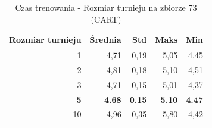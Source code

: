 \begin{table}[htbp]
\centering
\small
\setlength{\tabcolsep}{6pt}
\renewcommand{\arraystretch}{1.2}
\caption{Czas trenowania - Rozmiar turnieju na zbiorze 73 (CART)}
\label{tab:CART_tournament_size_73_time}
\begin{tabular}{r|r|r|r|r}
\toprule
Rozmiar turnieju & Średnia & Std & Maks & Min \\
\hline
1 & 4,71 & 0,19 & 5,05 & 4,45 \\
2 & 4,81 & 0,18 & 5,10 & 4,51 \\
3 & 4,71 & 0,15 & 5,01 & 4,37 \\
\textbf{5} & \textbf{4.68} & \textbf{0.15} & \textbf{5.10} & \textbf{4.47} \\
10 & 4,96 & 0,35 & 5,80 & 4,42 \\
\bottomrule
\end{tabular}
\end{table}